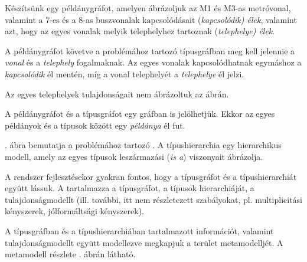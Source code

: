 Készítsünk egy példánygráfot, amelyen ábrázoljuk az M1 és M3-as metróvonal, valamint a 7-es és a 8-as buszvonalak kapcsolódásait (\textit{kapcsolódik) élek}, valamint azt, hogy az egyes vonalak melyik telephelyhez tartoznak (\textit{telephelye) élek}.


A példánygráfot követve a problémához tartozó típusgráfban meg kell jelennie a \textit{vonal} és a \textit{telephely} fogalmaknak. Az egyes vonalak kapcsolódhatnak egymáshoz a \textit{kapcsolódik} él mentén, míg a vonal telephelyét a \textit{telephelye} él jelzi.

\begin{megjegyzes}
Az egyes telephelyek tulajdonságait nem ábrázoltuk az ábrán.
\end{megjegyzes}


A példánygráfot és a típusgráfot egy gráfban is jelölhetjük. Ekkor az egyes példányok és a típusok között egy \textit{példánya} él fut.


. ábra bemutatja a problémához tartozó . A típushierarchia egy hierarchikus modell, amely az egyes típusok leszármazási (\textit{is a}) viszonyait ábrázolja.


A rendszer fejlesztésekor gyakran fontos, hogy a típusgráfot és a típushierarchiát együtt lássuk. A  tartalmazza a típusgráfot, a típusok hierarchiáját, a tulajdonságmodellt (ill. további, itt nem részletezett szabályokat, pl. multiplicitási kényszerek, jólformáltsági kényszerek).

A típusgráfban és a típushierarchiában tartalmazott információt, valamint tulajdonságmodellt együtt modellezve megkapjuk a terület metamodelljét. A metamodell részlete . ábrán látható.


